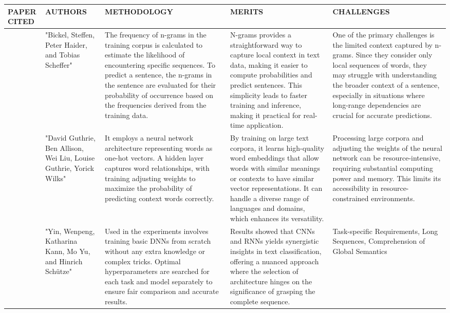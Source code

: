 \documentclass[fleqn,10pt]{thescipub} %
\begin{document}
\begin{table}
\begin{center}
 \centering
   \small %
    \begin{tabular}{ |p{1cm}|p{2cm}|p{4cm}|p{4cm}|p{4cm}| }
\hline
\centering PAPER CITED & \centering  AUTHORS & \centering METHODOLOGY &  \centering MERITS &  \centering CHALLENGES \arraybackslash \\ 
\hline
[12]  &  "Bickel, Steffen, Peter Haider, and Tobias Scheffer" &  The frequency of n-grams in the training corpus is calculated to estimate the likelihood of encountering specific sequences. To predict a sentence, the n-grams in the sentence are evaluated for their probability of occurrence based on the frequencies derived from the training data. &  N-grams provides a straightforward way to capture local context in text data, making it easier to compute probabilities and predict sentences. This simplicity leads to faster training and inference, making it practical for real-time application. &  One of the primary challenges is the limited context captured by n-grams. Since they consider only local sequences of words, they may struggle with understanding the broader context of a sentence, especially in situations where long-range dependencies are crucial for accurate predictions.  \\
\hline
[13]  & "David Guthrie, Ben Allison, Wei Liu, Louise Guthrie, Yorick Wilks" &  It employs a neural network architecture representing words as one-hot vectors. A hidden layer captures word relationships, with training adjusting weights to maximize the probability of predicting context words correctly. &  By training on large text corpora, it learns high-quality word embeddings that allow words with similar meanings or contexts to have similar vector representations. It can handle a diverse range of languages and domains, which enhances its versatility. &  Processing large corpora and adjusting the weights of the neural network can be resource-intensive, requiring substantial computing power and memory. This limits its accessibility in resource-constrained environments.  \\
\hline
[14]  &  "Yin, Wenpeng, Katharina Kann, Mo Yu, and Hinrich Schütze" &  Used in the experiments involves training basic DNNs from scratch without any extra knowledge or complex tricks. Optimal hyperparameters are searched for each task and model separately to ensure fair comparison and accurate results. &  Results showed that CNNs and RNNs yields synergistic insights in text classification, offering a nuanced approach where the selection of architecture hinges on the significance of grasping the complete sequence. &  Task-specific Requirements, Long Sequences, Comprehension of Global Semantics  \\

\end{tabular}
\end{center}
\end{table}
\end{document}
